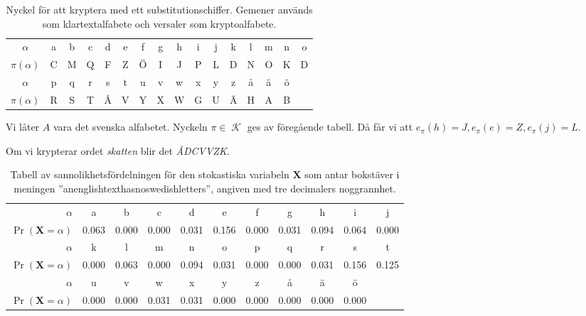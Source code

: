 \documentclass{beamer}
\theoremstyle{definition}
\DeclareMathOperator{\K}{\mathcal{K}}
\let\stoch\mathbf
\newcommand{\x}{\stoch X}
\begin{document}
\begin{frame}{\insertsubsectionhead}
  \begin{table}
    \centering\small
    \begin{tabular}{c|ccccccccccccccc}
      \toprule
      \(\alpha\) & a & b & c & d & e & f & g & h & i & j & k & l & m & n & o \\
      \(\pi(\alpha)\) 
      & C & M & Q & F & Z & Ö & I & J & P & L & D & N & O & K & D \\
      \midrule
      \(\alpha\) & p & q & r & s & t & u & v & w & x & y & z & å & ä & ö \\
      \(\pi(\alpha)\) 
      & R & S & T & Å & V & Y & X & W & G & U & Ä & H & A & B \\
      \bottomrule
    \end{tabular}
    \caption{Nyckel för att kryptera med ett substitutionschiffer.
      Gemener används som klartextalfabete och versaler som kryptoalfabete.}
    \label{tbl:Substitutionschiffer}
  \end{table}
\end{frame}

\begin{frame}{\insertsubsectionhead}
  \begin{example}
    Vi låter \(A\) vara det svenska alfabetet.
    Nyckeln \(\pi\in \K\) ges av föregående tabell.
    Då får vi att \(e_\pi(h) = J, e_\pi(e) = Z, e_\pi(j) = L\).
  \end{example}
  \begin{example}
    \label{ex:SubstitutionSkatten}
    Om vi krypterar ordet \emph{skatten} blir det \emph{ÅDCVVZK}.
  \end{example}
\end{frame}

\begin{frame}{\insertsubsectionhead}
  \begin{table}
    \centering\tiny
    \begin{tabular}{r|cccccccccc}
      \toprule
      \(\alpha\) & a & b & c & d & e & f & g & h & i & j  \\
      \(\Pr(\x = \alpha)\) & 0.063  & 0.000 & 0.000 & 0.031 & 0.156 & 0.000 
      & 0.031 & 0.094 & 0.064 & 0.000 \\
      \midrule
      \(\alpha\) & k & l & m & n & o & p & q & r & s & t \\
      \(\Pr(\x = \alpha)\) & 0.000 & 0.063 & 0.000 & 0.094 & 0.031 & 0.000 
      & 0.000 & 0.031 & 0.156 & 0.125 \\
      \midrule
      \(\alpha\) & u & v & w & x & y & z & å & ä & ö \\
      \(\Pr(\x = \alpha)\) & 0.000 & 0.000 & 0.031 & 0.031 & 0.000 & 0.000 
      & 0.000 & 0.000 & 0.000 \\
      \bottomrule
    \end{tabular}
    \caption{Tabell av sannolikhetsfördelningen för den stokastiska variabeln 
    \(\x\) som antar bokstäver i meningen ''anenglishtexthasnoswedishletters'', 
    angiven med tre decimalers noggrannhet.}
    \label{tbl:SannolikhetstabellKlartext}
  \end{table}
\end{frame}
\end{document}

